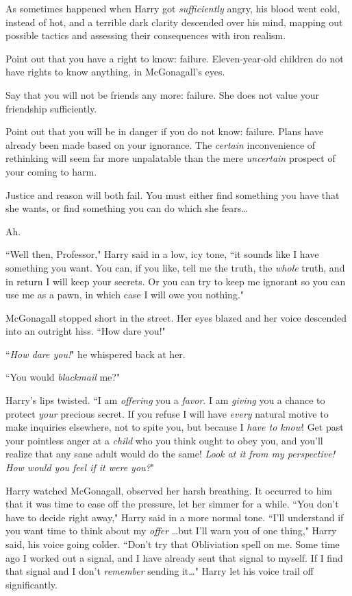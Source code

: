 As sometimes happened when Harry got \emph{sufficiently} angry, his blood went cold, instead of hot, and a terrible dark clarity descended over his mind, mapping out possible tactics and assessing their consequences with iron realism.

\begin{em}
Point out that you have a right to know: failure. Eleven-year-old children do not have rights to know anything, in McGonagall's eyes.

Say that you will not be friends any more: failure. She does not value your friendship sufficiently.

Point out that you will be in danger if you do not know: failure. Plans have already been made based on your ignorance. The \emph{certain} inconvenience of rethinking will seem far more unpalatable than the mere \emph{uncertain} prospect of your coming to harm.

Justice and reason will both fail. You must either find something you have that she wants, or find something you can do which she fears{\ldots}
\end{em}

Ah.

``Well then, Professor," Harry said in a low, icy tone, ``it sounds like I have something you want. You can, if you like, tell me the truth, the \emph{whole} truth, and in return I will keep your secrets. Or you can try to keep me ignorant so you can use me as a pawn, in which case I will owe you nothing."

McGonagall stopped short in the street. Her eyes blazed and her voice descended into an outright hiss. ``How dare you!"

``\emph{How dare you!}" he whispered back at her.

``You would \emph{blackmail} me?"

Harry's lips twisted. ``I am \emph{offering} you a \emph{favor}. I am \emph{giving} you a chance to protect \emph{your} precious secret. If you refuse I will have \emph{every} natural motive to make inquiries elsewhere, not to spite you, but because I \emph{have to know}! Get past your pointless anger at a \emph{child} who you think ought to obey you, and you'll realize that any sane adult would do the same! \emph{Look at it from my perspective! How would you feel if it were \emph{you}?}"

Harry watched McGonagall, observed her harsh breathing. It occurred to him that it was time to ease off the pressure, let her simmer for a while. ``You don't have to decide right away," Harry said in a more normal tone. ``I'll understand if you want time to think about my \emph{offer} {\ldots}but I'll warn you of one thing," Harry said, his voice going colder. ``Don't try that Obliviation spell on me. Some time ago I worked out a signal, and I have already sent that signal to myself. If I find that signal and I don't \emph{remember} sending it{\ldots}" Harry let his voice trail off significantly.

